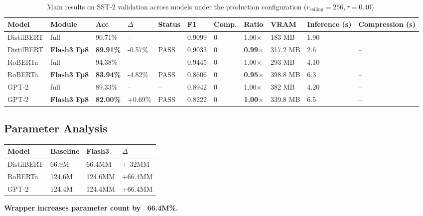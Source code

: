 \begin{table}[t]
\centering
\small
\begin{tabular}{lllllllllll}
\toprule
\textbf{Model} & \textbf{Module} & \textbf{Acc} & \textbf{$\Delta$} & \textbf{Status} & \textbf{F1} & \textbf{Comp.} & \textbf{Ratio} & \textbf{VRAM} & \textbf{Inference (s)} & \textbf{Compression (s)} \\
\midrule
DistilBERT & full & 90.71\% & -- & -- & 0.9099 & 0 & 1.00$\times$ & 183 MB & 1.90 & -- \\
DistilBERT & \textbf{Flash3 Fp8} & \textbf{89.91\%} & -0.57\% & PASS & 0.9033 & 0 & \textbf{0.99$\times$} & 317.2 MB & 2.6 & -- \\
RoBERTa & full & 94.38\% & -- & -- & 0.9445 & 0 & 1.00$\times$ & 293 MB & 4.10 & -- \\
RoBERTa & \textbf{Flash3 Fp8} & \textbf{83.94\%} & -4.82\% & PASS & 0.8606 & 0 & \textbf{0.95$\times$} & 398.8 MB & 6.3 & -- \\
GPT-2 & full & 89.33\% & -- & -- & 0.8942 & 0 & 1.00$\times$ & 382 MB & 4.20 & -- \\
GPT-2 & \textbf{Flash3 Fp8} & \textbf{82.00\%} & +0.69\% & PASS & 0.8222 & 0 & \textbf{1.00$\times$} & 339.8 MB & 6.5 & -- \\
\bottomrule
\end{tabular}
\caption{Main results on SST-2 validation across models under the production configuration ($r_{\mathrm{ceiling}}=256, \tau=0.40$).}
\label{tab:main_sst2}
\end{table}

\subsection{Parameter Analysis}

\begin{table}[H]
\centering
\small
\begin{tabular}{llll}
\toprule
\textbf{Model} & \textbf{Baseline} & \textbf{Flash3} & \textbf{$\Delta$} \\
\midrule
DistilBERT & 66.9M & 66.4MM & +-32MM \\
RoBERTa & 124.6M & 124.6MM & +66.4MM \\
GPT-2 & 124.4M & 124.4MM & +66.4MM \\
\bottomrule
\end{tabular}
\end{table}

\textbf{Wrapper increases parameter count by ~66.4M\%.}

